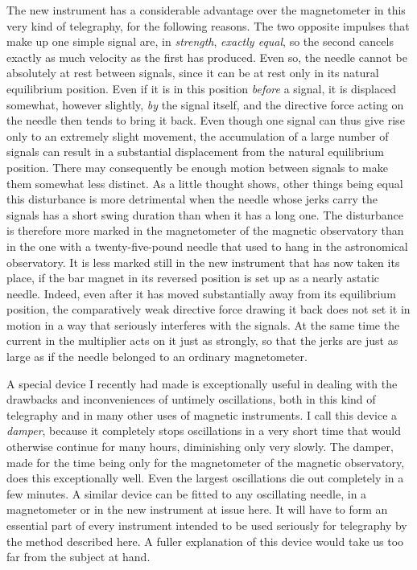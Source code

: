 The new instrument has a considerable advantage over the magnetometer in this very kind of telegraphy, for the following reasons. The two opposite impulses that make up one simple signal are, in \textit{strength}, \textit{exactly equal}, so the second cancels exactly as much velocity as the first has produced. Even so, the needle cannot be absolutely at rest between signals, since it can be at rest only in its natural equilibrium position. Even if it is in this position \textit{before} a signal, it is displaced somewhat, however slightly, \textit{by} the signal itself, and the directive force acting on the needle then tends to bring it back. Even though one signal can thus give rise only to an extremely slight movement, the accumulation of a large number of signals can result in a substantial displacement from the natural equilibrium position. There may consequently be enough motion between signals to make them somewhat less distinct. As a little thought shows, other things being equal this disturbance is more detrimental when the needle whose jerks carry the signals has a short swing duration than when it has a long one. The disturbance is therefore more marked in the magnetometer of the magnetic observatory than in the one with a twenty-five-pound needle that used to hang in the astronomical observatory. It is less marked still in the new instrument that has now taken its place, if the bar magnet in its reversed position is set up as a nearly astatic needle. Indeed, even after it has moved substantially away from its equilibrium position, the comparatively weak directive force drawing it back does not set it in motion in a way that seriously interferes with the signals. At the same time the current in the multiplier acts on it just as strongly, so that the jerks are just as large as if the needle belonged to an ordinary magnetometer.

A special device I recently had made is exceptionally useful in dealing with the drawbacks and inconveniences of untimely oscillations, both in this kind of telegraphy and in many other uses of magnetic instruments. I call this device a \textit{damper}, because it completely stops oscillations in a very short time that would otherwise continue for many hours, diminishing only very slowly. The damper, made for the time being only for the magnetometer of the magnetic observatory, does this exceptionally well. Even the largest oscillations die out completely in a few minutes. A similar device can be fitted to any oscillating needle, in a magnetometer or in the new instrument at issue here. It will have to form an essential part of every instrument intended to be used seriously for telegraphy by the method described here. A fuller explanation of this device would take us too far from the subject at hand.

